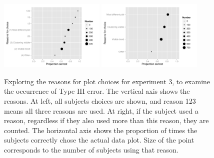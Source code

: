 \documentclass{article}
\newcommand{\blue}[1]{{\color{blue} #1}} %
\newcommand{\green}[1]{{\color{green} #1}} %
\newcommand{\hh}[1]{{\color{orange} #1}} %
\begin{document}



\begin{figure}[hbtp]
   \centering
       \includegraphics[width=0.45\textwidth]{choice_reason2.pdf}
       \includegraphics[width=0.45\textwidth]{choice_reason3.pdf}
       \caption{Exploring the reasons for plot choices for experiment 3, to examine the occurrence of Type III error. The vertical axis shows the reasons. At left, all subjects choices are shown, and reason 123 means all three reasons are used. At right, if the subject used a reason, regardless if they also used more than this reason, they are counted. The horizontal axis shows the proportion of times the subjects correctly chose the actual data plot. Size of the point corresponds to the number of subjects using that reason.}
       \label{fig:choice_reason}
\end{figure}
\end{document}
